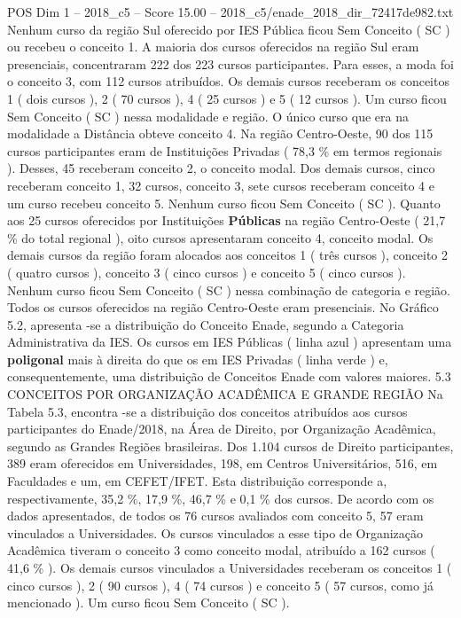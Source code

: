 \begin{textsample}{POS Dim 1 – 2018\_c5 – Score 15.00 – 2018\_c5/enade\_2018\_dir\_72417de982.txt}
Nenhum curso da região Sul oferecido por IES Pública ficou Sem Conceito ( SC ) ou recebeu o conceito 1.
A maioria dos cursos oferecidos na região Sul eram presenciais, concentraram 222 dos 223 cursos participantes.
Para esses, a moda foi o conceito 3, com 112 cursos atribuídos.
Os demais cursos receberam os conceitos 1 ( dois cursos ), 2 ( 70 cursos ), 4 ( 25 cursos ) e 5 ( 12 cursos ).
Um curso ficou Sem Conceito ( SC ) nessa modalidade e região.
O único curso que era na modalidade a Distância obteve conceito 4.
Na região Centro-Oeste, 90 dos 115 cursos participantes eram de Instituições Privadas ( 78,3 \% em termos regionais ).
Desses, 45 receberam conceito 2, o conceito modal.
Dos demais cursos, cinco receberam conceito 1, 32 cursos, conceito 3, sete cursos receberam conceito 4 e um curso recebeu conceito 5.
Nenhum curso ficou Sem Conceito ( SC ).
Quanto aos 25 cursos oferecidos por Instituições \textbf{Públicas} na região Centro-Oeste ( 21,7 \% do total regional ), oito cursos apresentaram conceito 4, conceito modal.
Os demais cursos da região foram alocados aos conceitos 1 ( três cursos ), conceito 2 ( quatro cursos ), conceito 3 ( cinco cursos ) e conceito 5 ( cinco cursos ).
Nenhum curso ficou Sem Conceito ( SC ) nessa combinação de categoria e região.
Todos os cursos oferecidos na região Centro-Oeste eram presenciais.
No Gráfico 5.2, apresenta -se a distribuição do Conceito Enade, segundo a Categoria Administrativa da IES.
Os cursos em IES Públicas ( linha azul ) apresentam uma \textbf{poligonal} mais à direita do que os em IES Privadas ( linha verde ) e, consequentemente, uma distribuição de Conceitos Enade com valores maiores. 5.3 CONCEITOS POR ORGANIZAÇÃO ACADÊMICA E GRANDE REGIÃO Na Tabela 5.3, encontra -se a distribuição dos conceitos atribuídos aos cursos participantes do Enade/2018, na Área de Direito, por Organização Acadêmica, segundo as Grandes Regiões brasileiras.
Dos 1.104 cursos de Direito participantes, 389 eram oferecidos em Universidades, 198, em Centros Universitários, 516, em Faculdades e um, em CEFET/IFET.
Esta distribuição corresponde a, respectivamente, 35,2 \%, 17,9 \%, 46,7 \% e 0,1 \% dos cursos.
De acordo com os dados apresentados, de todos os 76 cursos avaliados com conceito 5, 57 eram vinculados a Universidades.
Os cursos vinculados a esse tipo de Organização Acadêmica tiveram o conceito 3 como conceito modal, atribuído a 162 cursos ( 41,6 \% ).
Os demais cursos vinculados a Universidades receberam os conceitos 1 ( cinco cursos ), 2 ( 90 cursos ), 4 ( 74 cursos ) e conceito 5 ( 57 cursos, como já mencionado ).
Um curso ficou Sem Conceito ( SC ).

\end{textsample}
